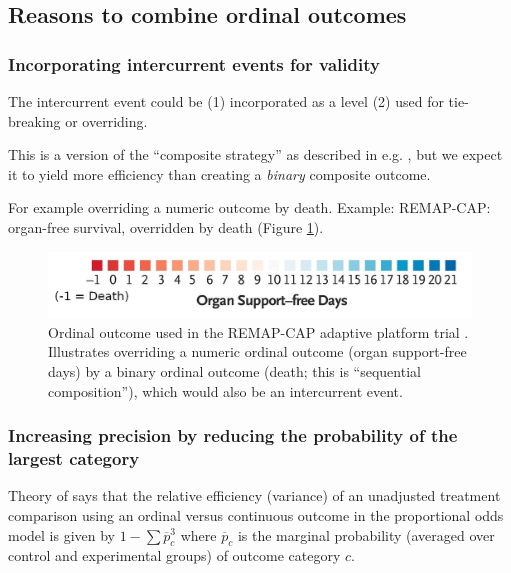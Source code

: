 \documentclass[
  11pt,
  fleqn
]{article}
\begin{document}
\subsection{Reasons to combine ordinal outcomes}

\subsubsection{Incorporating intercurrent events for validity}

The intercurrent event could be (1) incorporated as a level (2) used
for tie-breaking or overriding.

This is a version of the ``composite strategy'' as described in e.g.
\citet{kahanEstimandsFrameworkPrimer2024}, but we expect it to yield
more efficiency than creating a \emph{binary} composite outcome.

For example overriding a numeric outcome by death.
Example: REMAP-CAP: organ-free survival, overridden by death
(Figure \ref{fig:remap_cap_override}).

\begin{figure}
  \includegraphics[width=5in]{remap_outcome_extra_cropped.jpg}
  \caption{Ordinal outcome used in the REMAP-CAP adaptive
    platform trial
    \citep{theremap-capinvestigatorsInterleukin6ReceptorAntagonists2021}.
    Illustrates overriding a numeric ordinal outcome (organ
    support-free days) by a binary ordinal outcome (death; this is
    ``sequential composition''), which
  would also be an intercurrent event.}
  \label{fig:remap_cap_override}
\end{figure}

\subsubsection{Increasing precision by reducing the probability of the
largest category}

Theory of \citep{whiteheadSampleSizeCalculations1993} says that the relative
efficiency (variance) of an unadjusted treatment comparison using an ordinal
versus continuous outcome in the proportional odds model is given by $1 - \sum
\overline p_c^3$ where $\overline p_c$ is the marginal probability (averaged
over control and experimental groups) of outcome category $c$.
\end{document}

